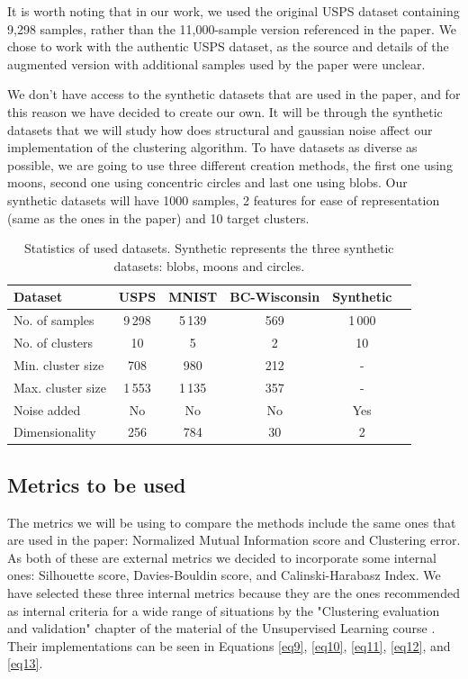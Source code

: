 \documentclass[
	10pt,
	parskip=half-,	
	paper=a4,
	english
	]{scrartcl}
\begin{document}
It is worth noting that in our work, we used the original USPS dataset containing 9,298 samples, rather than the 11,000-sample version referenced in the paper. We chose to work with the authentic USPS dataset, as the source and details of the augmented version with additional samples used by the paper were unclear.

We don't have access to the synthetic datasets that are used in the paper, and for this reason we have decided to create our own. It will be through the synthetic datasets that we will study how does structural and gaussian noise affect our implementation of the clustering algorithm. To have datasets as diverse as possible, we are going to use three different creation methods, the first one using moons, second one using concentric circles and last one using blobs. Our synthetic datasets will have 1000 samples, 2 features for ease of representation (same as the ones in the paper) and 10 target clusters.

\begin{table}[h]
\centering
\caption{Statistics of used datasets. Synthetic represents the three synthetic datasets: blobs, moons and circles.}
\begin{tabular}{lccccc}
\toprule
\textbf{Dataset} & \textbf{USPS} & \textbf{MNIST} & \textbf{BC-Wisconsin} & \textbf{Synthetic}\\
\midrule
No. of samples     & 9\,298 & 5\,139 & 569 & 1\,000 \\
No. of clusters    & 10     & 5     & 2    & 10   \\
Min. cluster size  & 708   & 980   & 212     & - \\
Max. cluster size  & 1\,553   & 1\,135  & 357     & - \\
Noise added  & No   & No  & No     & Yes \\
Dimensionality     & 256    & 784   & 30   & 2 \\
\bottomrule
\end{tabular}
\end{table}

\subsection{Metrics to be used}

The metrics we will be using to compare the methods include the same ones that are used in the paper: Normalized Mutual Information score and Clustering error. As both of these are external metrics we decided to incorporate some internal ones: Silhouette score, Davies-Bouldin score, and Calinski-Harabasz Index. We have selected these three internal metrics because they are the ones recommended as internal criteria for a wide range of situations by the "Clustering evaluation and validation" chapter of the material of the Unsupervised Learning course \cite{citation2}. Their implementations can be seen in Equations \ref{eq9}, \ref{eq10}, \ref{eq11}, \ref{eq12}, and \ref{eq13}.
\end{document}
